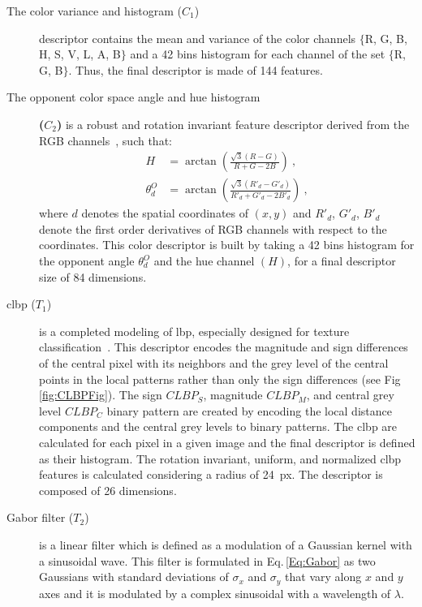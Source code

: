 \begin{description}
\item[The color variance and histogram ($C_{1}$)] descriptor contains the mean and variance of the color channels $\{$R, G, B, H, S, V, L, A, B$\}$ and a 42 bins histogram for each channel of the set $\{$R, G, B$\}$. Thus, the final descriptor is made of 144 features.
\item[The opponent color space angle and hue histogram] \textbf{($C_{2}$)} is a robust and rotation invariant feature descriptor derived from the RGB channels~\cite{van2006coloring}, such that:
  \begin{align}\label{Eq:AngO}
    H &= \arctan\left(\frac{\sqrt{3}\left(R-G\right)}{R+G-2B}\right) \ , \nonumber \\
    \theta^{O}_{d} &= \arctan \left( \frac{\sqrt{3}\left(R'_{d}-G'_{d}\right)}{R'_{d}+G'_{d}-2B'_{d}}\right) \ ,
  \end{align}
\noindent where $d$ denotes the spatial coordinates of $(x,y)$ and $R'_{d}$, $G'_{d}$, $B'_{d}$ denote the first order derivatives of RGB channels with respect to the coordinates. 
This color descriptor is built by taking a 42 bins histogram for the opponent angle $\theta^{O}_{d}$ and the hue channel $(H)$, for a final descriptor size of 84 dimensions.
\item[\ac{clbp} ($T_{1}$)] is a completed modeling of \Ac{lbp}, especially designed for texture classification~\cite{guo2010completed}. 
This descriptor encodes the magnitude and sign differences of the central pixel with its neighbors and the grey level of the central points in the local patterns rather than only the sign differences (see Fig\,\ref{fig:CLBPFig}). 
The sign $CLBP_S$, magnitude $CLBP_M$, and central grey level $CLBP_C$ binary pattern are created by encoding the local distance components and the central grey levels to binary patterns.  
The \ac{clbp} are calculated for each pixel in a given image and the final descriptor is defined as their histogram.
The rotation invariant, uniform, and normalized \ac{clbp} features is calculated considering a radius of \SI{24}{px}.
The descriptor is composed of 26 dimensions.
\item[Gabor filter ($T_{2}$)] is a linear filter which is defined as a modulation of a Gaussian kernel with a sinusoidal wave. 
This filter is formulated in Eq.\,\eqref{Eq:Gabor} as two Gaussians with standard deviations of $\sigma_{x}$ and $\sigma_{y}$ that vary along $x$ and $y$ axes and it is modulated by a complex sinusoidal with a wavelength of $\lambda$. 

\end{description}
